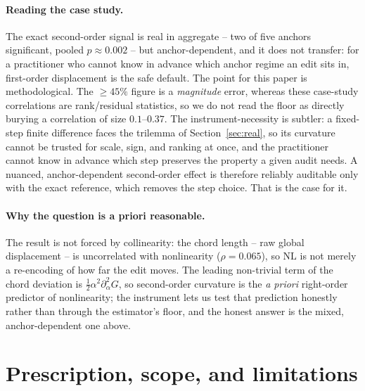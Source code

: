 \documentclass[10pt]{article}
\begin{document}
\paragraph{Reading the case study.} The exact second-order signal is real in aggregate -- two of
five anchors significant, pooled $p\approx0.002$ -- but anchor-dependent, and it does not transfer:
for a practitioner who cannot know in advance which anchor regime an edit sits in, first-order
displacement is the safe default. The point for this paper is methodological. The $\geq45\%$ figure is
a \emph{magnitude} error, whereas these case-study correlations are rank/residual statistics, so we do
not read the floor as directly burying a correlation of size $0.1$--$0.37$. The instrument-necessity is
subtler: a fixed-step finite difference faces the trilemma of Section~\ref{sec:real}, so its curvature
cannot be trusted for scale, sign, and ranking at once, and the practitioner cannot know in advance which
step preserves the property a given audit needs. A nuanced, anchor-dependent second-order effect is
therefore reliably auditable only with the exact reference, which removes the step choice. That is the
case for it.

\paragraph{Why the question is a priori reasonable.} The result is not forced by collinearity:
the chord length -- raw global displacement -- is uncorrelated with nonlinearity ($\rho=0.065$), so
$\mathrm{NL}$ is not merely a re-encoding of how far the edit moves. The leading non-trivial term of
the chord deviation is $\tfrac12\alpha^2\partial^2_\alpha G$, so second-order curvature is the
\emph{a priori} right-order predictor of nonlinearity; the instrument lets us test that prediction
honestly rather than through the estimator's floor, and the honest answer is the mixed,
anchor-dependent one above.

\section{Prescription, scope, and limitations}
\label{sec:scope}
\end{document}
